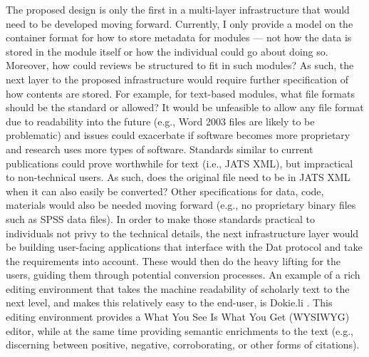 \documentclass[publications,article,submit,moreauthors,pdftex,10pt,a4paper]{Definitions/mdpi}
\begin{document}
The proposed design is only the first in a multi-layer infrastructure that would need to be developed moving forward. Currently, I only provide a model on the container format for how to store metadata for modules --- not how the data is stored in the module itself or how the individual could go about doing so. Moreover, how could reviews be structured to fit in such modules? 
As such, the next layer to the proposed infrastructure would require further specification of how contents are stored. For example, for text-based modules, what file formats should be the standard or allowed? It would be unfeasible to allow any file format due to readability into the future (e.g., Word 2003 files are likely to be problematic) and issues could exacerbate if software becomes more proprietary and research uses more types of software. Standards similar to current publications could prove worthwhile for text (i.e., JATS XML), but impractical to non-technical users. As such, does the original file need to be in JATS XML when it can also easily be converted? \citep[e.g., Markdown to JATS XML;][]{jatdown} Other specifications for data, code, materials would also be needed moving forward (e.g., no proprietary binary files such as SPSS data files). In order to make those standards practical to individuals not privy to the technical details, the next infrastructure layer would be building user-facing applications that interface with the Dat protocol and take the requirements into account. These would then do the heavy lifting for the users, guiding them through potential conversion processes. An example of a rich editing environment that takes the machine readability of scholarly text to the next level, and makes this relatively easy to the end-user, is Dokie.li \citep[which writes to HTML;][]{dokieli}. This editing environment provides a What You See Is What You Get (WYSIWYG) editor, while at the same time providing semantic enrichments to the text (e.g., discerning between positive, negative, corroborating, or other forms of citations).
\end{document}
